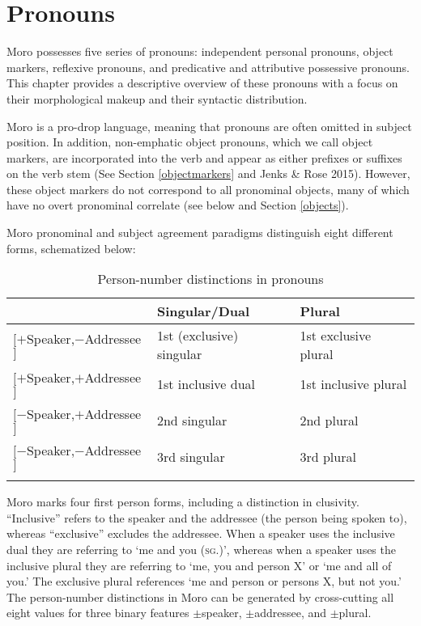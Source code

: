 \chapter{Pronouns}\label{chap:7:pronouns}

Moro possesses five series of pronouns: independent personal pronouns, object markers, reflexive pronouns, and predicative and attributive possessive pronouns.  This chapter provides a descriptive overview of these pronouns with a focus on their morphological makeup and their syntactic distribution. %

Moro is a pro-drop language, meaning that pronouns are often omitted in subject position. In addition, non-emphatic object pronouns, which we call object markers, are incorporated into the verb and appear as either prefixes or suffixes on the verb stem (See Section \ref{objectmarkers} and  Jenks \& Rose 2015). However, these object markers do not correspond to all pronominal objects, many of which have no overt pronominal correlate (see below and Section \ref{objects}).

Moro pronominal and subject agreement paradigms distinguish eight different forms, schematized below:

\begin{table}
	\begin{tabular}[t]{lll}
\lsptoprule
& Singular/Dual & Plural \\
\midrule
$[+${Speaker},$-${Addressee}$]$ & 1st (exclusive) singular & 1st exclusive plural \\
$[+${Speaker},$+${Addressee}$]$ &1st inclusive dual & 1st inclusive plural\\
$[-${Speaker},$+${Addressee}$]$ & 2nd singular & 2nd plural \\
$[-${Speaker},$-${Addressee}$]$ & 3rd singular & 3rd plural\\
\lspbottomrule	
\end{tabular}
  \caption{Person-number distinctions in pronouns}
  \label{tab:ch7:2}
\end{table}

Moro marks four first person forms, including a distinction in clusivity. “Inclusive” refers to the speaker and the addressee (the person being spoken to), whereas “exclusive” excludes the addressee. When a speaker uses the inclusive dual they are referring to ‘me and you (\textsc{sg}.)’, whereas when a speaker uses the inclusive plural they are referring to ‘me, you and person X’ or `me and all of you.' The exclusive plural references ‘me and person or persons X, but not you.’ The person-number distinctions in Moro can be generated by cross-cutting all eight values for three binary features $\pm$speaker, $\pm$addressee, and $\pm$plural. 

